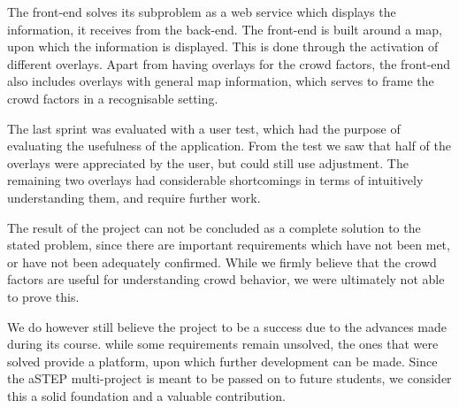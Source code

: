 
The front-end solves its subproblem as a web service which displays the information, it receives from the back-end. The front-end is built around a map, upon which the information is displayed. This is done through the activation of different overlays. Apart from having overlays for the crowd factors, the front-end also includes overlays with general map information, which serves to frame the crowd factors in a recognisable setting.

The last sprint was evaluated with a user test, which had the purpose of evaluating the usefulness of the application. From the test we saw that half of the overlays were appreciated by the user, but could still use adjustment. The remaining two overlays had considerable shortcomings in terms of intuitively understanding them, and require further work.

The result of the project can not be concluded as a complete solution to the stated problem, since there are important requirements which have not been met, or have not been adequately confirmed. While we firmly believe that the crowd factors are useful for understanding crowd behavior, we were ultimately not able to prove this.

We do however still believe the project to be a success due to the advances made during its course. while some requirements remain unsolved, the ones that were solved provide a platform, upon which further development can be made. Since the aSTEP multi-project is meant to be passed on to future students, we consider this a solid foundation and a valuable contribution.
 
 




